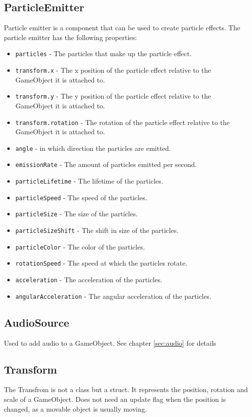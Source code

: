 \subsection{ParticleEmitter}
Particle emitter is a component that can be used to create particle effects.
The particle emitter has the following properties:
\begin{itemize}
    \item \texttt{particles} - The particles that make up the particle effect.
    \item \texttt{transform.x} - The x position of the particle effect relative to the GameObject it is attached to.
    \item \texttt{transform.y} - The y position of the particle effect relative to the GameObject it is attached to.
    \item \texttt{transform.rotation} - The rotation of the particle effect relative to the GameObject it is attached to.
    \item \texttt{angle} - in which direction the particles are emitted.
    \item \texttt{emissionRate} - The amount of particles emitted per second.
    \item \texttt{particleLifetime} - The lifetime of the particles.
    \item \texttt{particleSpeed} - The speed of the particles.
    \item \texttt{particleSize} - The size of the particles.
    \item \texttt{particleSizeShift} - The shift in size of the particles.
    \item \texttt{particleColor} - The color of the particles.
    \item \texttt{rotationSpeed} - The speed at which the particles rotate.
    \item \texttt{acceleration} - The acceleration of the particles.
    \item \texttt{angularAcceleration} - The angular acceleration of the particles.
\end{itemize}

\subsection{AudioSource}
Used to add audio to a GameObject. See chapter \autoref{sec:audio} for details

\subsection{Transform}
The Transfrom is not a class but a struct. It represents the position, rotation and scale of a GameObject.
Does not need an update flag when the position is changed, as a movable object is usually moving.


